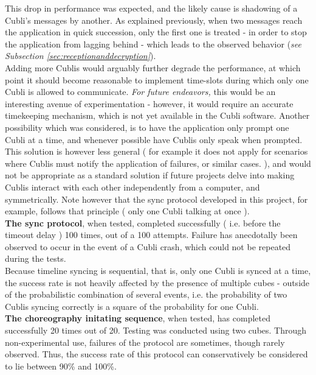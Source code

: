 This drop in performance was expected, and the likely cause is shadowing of a Cubli's messages by another. As explained previously, when two messages reach the application in quick succession, only the first one is treated - in order to stop the application from lagging behind - which leads to the observed behavior (\textit{see Subsection \ref{sec:receptionanddecryption}}). \\

Adding more Cublis would arguably further degrade the performance, at which point it should become reasonable to implement time-slots during which only one Cubli is allowed to communicate. \textit{ For future endeavors, } this would be an interesting avenue of experimentation - however, it would require an accurate timekeeping mechanism, which is not yet available in the Cubli software. Another possibility which was considered, is to have the application only prompt one Cubli at a time, and whenever possible have Cublis only speak when prompted. This solution is however less general ( for example it does not apply for scenarios where Cublis must notify the application of failures, or similar cases. ), and would not be appropriate as a standard solution if future projects delve into making Cublis interact with each other independently from a computer, and symmetrically. Note however that the sync protocol developed in this project, for example, follows that principle ( only one Cubli talking at once ). \\

\textbf{The sync protocol}, when tested, completed successfully ( i.e. before the timeout delay ) 100 times, out of a 100 attempts. Failure has anecdotally been observed to occur in the event of a Cubli crash, which could not be repeated during the tests.\\

Because timeline syncing is sequential, that is, only one Cubli is synced at a time, the success rate is not heavily affected by the presence of multiple cubes - outside of the probabilistic combination of several events, i.e. the probability of two Cublis syncing correctly is a square of the probability for one Cubli.\\

\textbf{The choreography initating sequence}, when tested, has completed successfully 20 times out of 20. Testing was conducted using two cubes. Through non-experimental use, failures of the protocol are sometimes, though rarely observed. Thus, the success rate of this protocol can conservatively be considered to lie between 90\% and 100\%. \\

